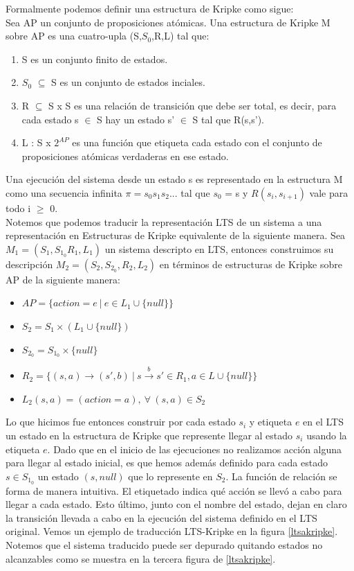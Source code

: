 \documentclass[titlepage, 12pt]{book}
\begin{document}
Formalmente podemos definir una estructura de Kripke como sigue\cite{Clarke}:\\

Sea AP un conjunto de proposiciones at\'omicas. Una estructura de Kripke M sobre AP es una cuatro-upla (S,$S_0$,R,L) tal que:
\begin{enumerate}
\item S es un conjunto finito de estados.
\item $S_0$ $\subseteq$ S es un conjunto de estados inciales.
\item R $\subseteq$ S x S es una relaci\'on de transici\'on que debe ser total, es decir, para cada estado s $\in$ S hay un estado s' $\in$ S tal que R(s,s').
\item L : S x $2^{AP}$ es una funci\'on que etiqueta cada estado con el conjunto de proposiciones at\'omicas verdaderas en ese estado.
\end{enumerate}
Una ejecuci\'on del sistema desde un estado s es representado en la estructura M como una secuencia infinita $\pi = s_0s_1s_2...$ tal que $s_0$ = s y $R(s_i,s_{i+1})$ vale para todo i $\geq$ 0.\\

Notemos que podemos traducir la representaci\'on LTS de un sistema a una representaci\'on en Estructuras de Kripke equivalente de la siguiente manera. Sea $M_1 = (S_1, S_{1_0} R_1, L_1)$ un sistema descripto en LTS, entonces construimos su descripci\'on $M_2 = (S_2,S_{2_0},R_2,L_2)$ en t\'erminos de estructuras de Kripke sobre AP de la siguiente manera:
\begin{itemize}
\item $ AP = \{action = e ~|~ e \in L_1 \cup \{null\}\} $
\item $ S_2 = S_1 \times (L_1 \cup \{null\}) $
\item $S_{2_0} = S_{1_0} \times \{null\}$
\item $R_2 = \{(s,a) \rightarrow (s',b) ~|~ s\overset{b}{\rightarrow}s' \in R_1, a \in L \cup \{null\}\}$
\item $L_2(s,a) = (action = a), ~\forall~(s,a) \in S_2$
\end{itemize}
Lo que hicimos fue entonces construir por cada estado $s_i$ y etiqueta $e$ en el LTS un estado en la estructura de Kripke que represente llegar al estado $s_i$ usando la etiqueta $e$. Dado que en el inicio de las ejecuciones no realizamos acci\'on alguna para llegar al estado inicial, es que hemos adem\'as definido para cada estado $s \in S_{1_0}$ un estado $(s,null)$ que lo represente en $S_2$. La funci\'on de relaci\'on se forma de manera intuitiva. El etiquetado indica qu\'e acci\'on se llev\'o a cabo para llegar a cada estado. Esto \'ultimo, junto con el nombre del estado, dejan en claro la transici\'on llevada a cabo en la ejecuci\'on del sistema definido en el LTS original. Vemos un ejemplo de traducci\'on LTS-Kripke en la figura \ref{ltsakripke}. Notemos que el sistema traducido puede ser depurado quitando estados no alcanzables como se muestra en la tercera figura de \ref{ltsakripke}.
\end{document}
